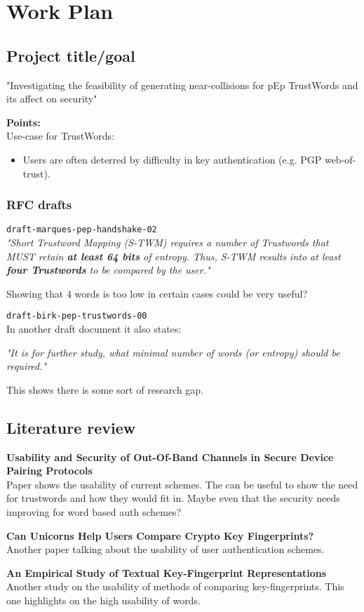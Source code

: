 \chapter{Work Plan}

\section{Project title/goal}

{
    \small
    "Investigating the feasibility of generating near-collisions for pEp TrustWords and its affect on security"

    \textbf{Points: } \\
    Use-case for TrustWords:
    \begin{itemize}
        \item Users are often deterred by difficulty in key authentication (e.g. PGP web-of-trust).
    \end{itemize}
}


\subsection{RFC drafts}
{
\small
\verb|draft-marques-pep-handshake-02|
\\
\textit{"Short Trustword Mapping (S-TWM) requires a number of Trustwords that MUST retain \textbf{at least 64 bits} of entropy.  Thus, S-TWM results into at least \textbf{four Trustwords} to be compared by the user."}

Showing that 4 words is too low in certain cases could be very useful?

\verb|draft-birk-pep-trustwords-00|
\\
In another draft document it also states:

\textit{"It is for further study, what minimal number of words (or entropy) should be required."}

This shows there is some sort of research gap.
}

\section{Literature review}
\label{litReview}

{
\small
\textbf{Usability and Security of Out-Of-Band Channels in Secure Device Pairing Protocols}\\
Paper shows the usability of current schemes. The can be useful to show the need for trustwords and how they would fit in. Maybe even that the security needs improving for word based auth schemes?

\textbf{Can Unicorns Help Users Compare Crypto Key Fingerprints?}\\
Another paper talking about the usability of user authentication schemes.

\textbf{An Empirical Study of Textual Key-Fingerprint Representations}\\
Another study on the usability of methods of comparing key-fingerprints. This one highlights on the high usability of words.

}

